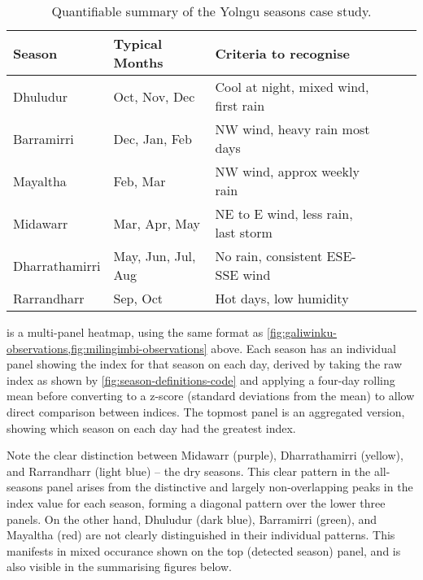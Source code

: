 \clearpage

\begin{table}[h]
    \centering
    \caption{Quantifiable summary of the Yolngu seasons case study.}
    \label{tab:quant-seasons-summary}
    \sffamily\small
    \begin{tabular}{llllll}
        \toprule
        Season          &  Typical Months       &  Criteria to recognise                    \\
        \midrule
        Dhuludur        &  Oct, Nov, Dec        &  Cool at night, mixed wind, first rain    \\
        Barramirri      &  Dec, Jan, Feb        &  NW wind, heavy rain most days            \\
        Mayaltha        &  Feb, Mar             &  NW wind, approx weekly rain              \\
        Midawarr        &  Mar, Apr, May        &  NE to E wind, less rain, last storm      \\
        Dharrathamirri  &  May, Jun, Jul, Aug   &  No rain, consistent ESE-SSE wind         \\
        Rarrandharr     &  Sep, Oct             &  Hot days, low humidity                   \\
        \bottomrule
    \end{tabular}
\end{table}

 is a multi-panel heatmap, using the same format
as \cref{fig:galiwinku-observations,fig:milingimbi-observations} above.
Each season has an individual panel showing the index for that season on each
day, derived by taking the raw index as shown by \cref{fig:season-definitions-code}
and applying a four-day rolling mean before converting to a z-score (standard
deviations from the mean) to allow direct comparison between indices.
The topmost panel is an aggregated version, showing which season on each day
had the greatest index.

Note the clear distinction between Midawarr (purple), Dharrathamirri (yellow),
and Rarrandharr (light blue) -- the dry seasons.  This clear pattern in the
all-seasons panel arises from the distinctive and largely non-overlapping
peaks in the index value for each season, forming a diagonal pattern over
the lower three panels.
%
On the other hand, Dhuludur (dark blue), Barramirri (green), and Mayaltha
(red) are not clearly distinguished in their individual patterns.  This
manifests in mixed occurance shown on the top (detected season) panel, and
is also visible in the summarising figures below.



